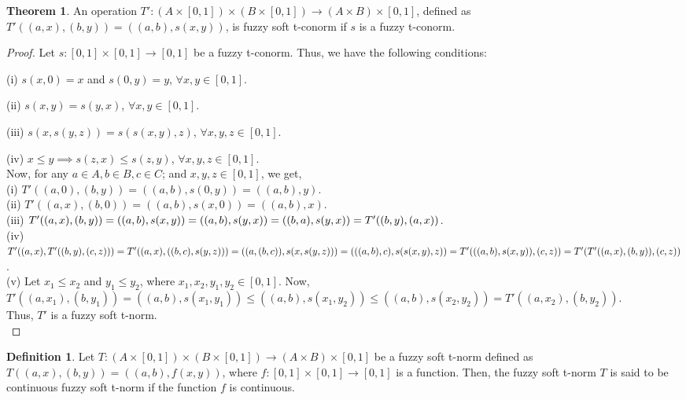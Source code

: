 \documentclass{article}
\theoremstyle{definition}
\newtheorem{theorem}{Theorem}[section]
\newtheorem{definition}{Definition}[section]
\begin{document}
\begin{theorem}
     An operation $T':(A\times[0, 1])\times (B\times[0, 1]) \to (A\times B)\times[0, 1]$, defined as $T'((a, x), (b, y)) = ((a, b), s(x, y))$, is fuzzy soft t-conorm if $s$ is a fuzzy t-conorm.
\end{theorem}
\begin{proof}
     Let $s:[0, 1]\times [0, 1] \to [0, 1]$ be a fuzzy t-conorm. Thus, we have the following conditions:
    
    (i) $s(x, 0)=x$ and $s(0, y)=y$, $\forall x, y \in [0, 1]$.
    
    (ii) $s(x, y)=s(y, x)$, $\forall x, y \in [0, 1]$.
    
    (iii) $s(x, s(y, z))=s(s(x, y), z)$, $\forall x, y, z\in [0, 1]$.

    (iv) $x \leq y \implies s(z, x)\leq s(z, y)$, $\forall x, y, z\in [0, 1]$.\\
    
Now, for any $a\in A, b\in B, c\in C $; and $ x, y, z\in [0, 1]$, we get,\\


(i) $T'((a, 0), (b, y))=((a, b), s(0, y))=((a, b), y)$.\\

(ii) $T'((a, x), (b, 0))=((a, b), s(x, 0))=((a, b), x)$.\\

(iii) $T'((a, x), (b, y))=((a, b), s(x, y))=((a, b), s(y, 
x))=((b, a), s(y, x))\\=T'((b, y), (a, x))$.\\

(iv) $T'((a, x), T'((b, y), (c, z)))=T'((a, x),((b, c), s(y, z)))=((a, (b, c)), s(x, s(y, z)))\\=(((a, b), c), s(s(x, y), z))=T'(((a, b), s(x, y)), (c, z))=T'(T'((a, x), (b, y)), (c, z))$.\\

(v) Let $x_1\leq x_2$ and $y_1\leq y_2$, where $x_1, x_2, y_1, y_2 \in [0, 1]$. Now, $T'((a, x_1), (b, y_1))=((a, b), s(x_1, y_1)) \leq ((a, b), s(x_1, y_2)) \leq ((a, b), s(x_2, y_2))=T'((a, x_2), (b, y_2))$.\\

Thus,  $T'$ is a fuzzy soft t-norm.\\
\end{proof}
\begin{definition}
    Let $T:(A\times[0, 1])\times (B\times[0, 1]) \to (A\times B)\times[0, 1]$ be a fuzzy soft t-norm defined as $T((a, x), (b, y)) = ((a, b), f(x, y))$, where $f:[0, 1]\times [0, 1] \to [0, 1]$ is a function. Then, the fuzzy soft t-norm $T$ is said to be continuous fuzzy soft t-norm if the function $f$ is continuous. 
\end{definition}
\end{document}
